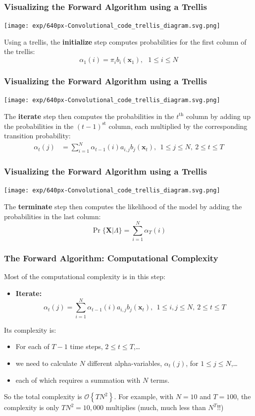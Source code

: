\documentclass{beamer}
\begin{document}
\begin{frame}
  \frametitle{Visualizing the Forward Algorithm using a Trellis}

  \centerline{\texttt{[image: exp/640px-Convolutional\_code\_trellis\_diagram.svg.png]}}

  Using a trellis, the {\bf initialize} step computes probabilities
  for the first column of the trellis:
  \[
  \alpha_1(i) = \pi_i b_i(\mathbf{x}_1),~~~1\le i\le N
  \]  
\end{frame}

\begin{frame}
  \frametitle{Visualizing the Forward Algorithm using a Trellis}

  \centerline{\texttt{[image: exp/640px-Convolutional\_code\_trellis\_diagram.svg.png]}}

  The {\bf iterate} step then computes the probabilities in the
  $t^{\textrm{th}}$ column by adding up the probabilities in the
  $(t-1)^{\textrm{st}}$ column, each multiplied by the corresponding
  transition probability:
  \begin{align*}
    \alpha_{t}(j) &= \sum_{i=1}^N \alpha_{t-1}(i) a_{i,j}b_j(\mathbf{x}_t),~~1\le j\le N,~2\le t\le T
  \end{align*}
\end{frame}

\begin{frame}
  \frametitle{Visualizing the Forward Algorithm using a Trellis}

  \centerline{\texttt{[image: exp/640px-Convolutional\_code\_trellis\_diagram.svg.png]}}

  The {\bf terminate} step then computes the likelihood of the model
  by adding the probabilities in the last column:
  \[
  \Pr\{\mathbf{X}|\Lambda\} = \sum_{i=1}^N \alpha_T(i)
  \]
\end{frame}
  
\begin{frame}
  \frametitle{The Forward Algorithm: Computational Complexity}

  Most of the computational complexity is in this step:
  \begin{itemize}
  \item {\bf Iterate:}
    \[
    \alpha_{t}(j) = \sum_{i=1}^N \alpha_{t-1}(i) a_{i,j}b_j(\mathbf{x}_t),~~1\le i,j\le N,~2\le t\le T
    \]
  \end{itemize}
  Its complexity is:
  \begin{itemize}
  \item For each of $T-1$ time steps, $2\le t\le T$,\ldots
  \item we need to calculate $N$ different alpha-variables, $\alpha_t(j)$, for $1\le j\le N$,\ldots
  \item each of which requires a summation with $N$ terms.
  \end{itemize}
  So the total complexity is ${\mathcal O}\left\{TN^2\right\}$.  For
  example, with $N=10$ and $T=100$, the complexity is only $TN^2=10,000$
  multiplies (much, much less than $N^T$!!)
\end{frame}
\end{document}
